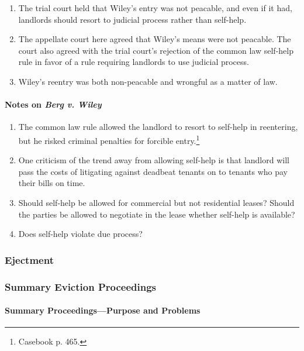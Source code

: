\begin{enumerate}
\begin{enumerate}
\begin{enumerate}
            \item The trial court held that Wiley's entry was not peacable, 
            and even if it had, landlords should resort to judicial process 
            rather than self-help.
            \item The appellate court here agreed that Wiley's means were not 
            peacable. The court also agreed with the trial court's rejection 
            of the common law self-help rule in favor of a rule requiring 
            landlords to use judicial process.
            \item Wiley's reentry was both non-peacable and wrongful as a 
            matter of law.
        \end{enumerate}
    \end{enumerate}
\end{enumerate}

\paragraph{Notes on \emph{Berg v. Wiley}}

\begin{enumerate}
    \item The common law rule allowed the landlord to resort to self-help in 
    reentering, but he risked criminal penalties for forcible 
    entry.\footnote{Casebook p. 465.}
    \item One criticism of the trend away from allowing self-help is that 
    landlord will pass the costs of litigating against deadbeat tenants on to 
    tenants who pay their bills on time.
    \item Should self-help be allowed for commercial but not residential 
    leases? Should the parties be allowed to negotiate in the lease whether 
    self-help is available?
    \item Does self-help violate due process?
\end{enumerate}

\subsubsection{Ejectment} %

\subsubsection{Summary Eviction Proceedings} %

\paragraph{Summary Proceedings---Purpose and Problems}

